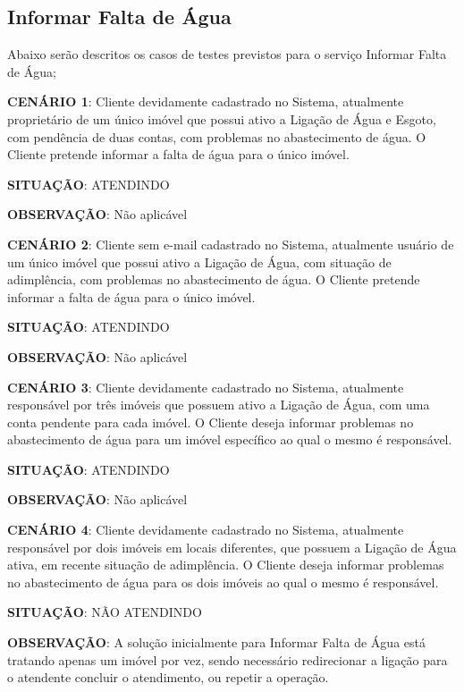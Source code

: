 \subsection{Informar Falta de Água}
Abaixo serão descritos os casos de testes previstos para o serviço Informar Falta de Água;
\begin{flushleft}
	\begin{description}
		\item \textbf{CENÁRIO 1}: Cliente devidamente cadastrado no Sistema, atualmente proprietário de um único imóvel que possui ativo a Ligação de Água e Esgoto, com pendência de duas contas, com problemas no abastecimento de água. O Cliente pretende informar a falta de água para o único imóvel.
		\item \textbf{SITUAÇÃO}: ATENDINDO
		\item \textbf{OBSERVAÇÃO}: Não aplicável
	\end{description}
	\begin{description}
		\item \textbf{CENÁRIO 2}: Cliente sem e-mail cadastrado no Sistema, atualmente usuário de um único imóvel que possui ativo a Ligação de Água, com situação de adimplência, com problemas no abastecimento de água. O Cliente pretende informar a falta de água para o único imóvel.
		\item \textbf{SITUAÇÃO}: ATENDINDO
		\item \textbf{OBSERVAÇÃO}: Não aplicável
	\end{description}
	\begin{description}
		\item \textbf{CENÁRIO 3}: Cliente devidamente cadastrado no Sistema, atualmente responsável por três imóveis que possuem ativo a Ligação de Água, com uma conta pendente para cada imóvel. O Cliente deseja informar problemas no abastecimento de água para um imóvel específico ao qual o mesmo é responsável.
		\item \textbf{SITUAÇÃO}: ATENDINDO
		\item \textbf{OBSERVAÇÃO}: Não aplicável
	\end{description}
	\begin{description}
		\item \textbf{CENÁRIO 4}: Cliente devidamente cadastrado no Sistema, atualmente responsável por dois imóveis em locais diferentes, que possuem a Ligação de Água ativa, em recente situação de adimplência. O Cliente deseja informar problemas no abastecimento de água para os dois imóveis ao qual o mesmo é responsável.
		\item \textbf{SITUAÇÃO}: NÃO ATENDINDO
		\item \textbf{OBSERVAÇÃO}: A solução inicialmente para Informar Falta de Água está tratando apenas um imóvel por vez, sendo necessário redirecionar a ligação para o atendente concluir o atendimento, ou repetir a operação.
	\end{description}
\end{flushleft}	

